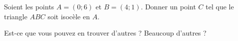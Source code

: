 
\begin{exercice}\label{exoSeconde-0005}

    Soient les points \( A=(0;6)\) et \( B=(4;1)\). Donner un point \( C\) tel que le triangle \( ABC\) soit isocèle en \( A\).

    Est-ce que vous pouvez en trouver d'autres ? Beaucoup d'autres ?

\end{exercice}
